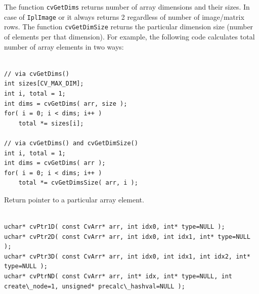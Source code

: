 The function \texttt{cvGetDims} returns number of array dimensions and
their sizes. In case of \texttt{IplImage} or  it always
returns 2 regardless of number of image/matrix rows. The function
\texttt{cvGetDimSize} returns the particular dimension size (number of
elements per that dimension). For example, the following code calculates
total number of array elements in two ways:

\begin{lstlisting}

// via cvGetDims()
int sizes[CV_MAX_DIM];
int i, total = 1;
int dims = cvGetDims( arr, size );
for( i = 0; i < dims; i++ )
    total *= sizes[i];

// via cvGetDims() and cvGetDimSize()
int i, total = 1;
int dims = cvGetDims( arr );
for( i = 0; i < dims; i++ )
    total *= cvGetDimsSize( arr, i );

\end{lstlisting}


\label{PtrnD}

Return pointer to a particular array element.

\begin{lstlisting}

uchar* cvPtr1D( const CvArr* arr, int idx0, int* type=NULL );
uchar* cvPtr2D( const CvArr* arr, int idx0, int idx1, int* type=NULL );
uchar* cvPtr3D( const CvArr* arr, int idx0, int idx1, int idx2, int* type=NULL );
uchar* cvPtrND( const CvArr* arr, int* idx, int* type=NULL, int create\_node=1, unsigned* precalc\_hashval=NULL );

\end{lstlisting}

\begin{description}
\end{description}

